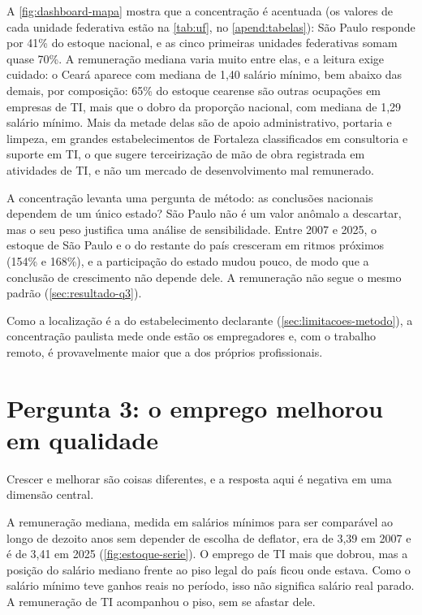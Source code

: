 A \autoref{fig:dashboard-mapa} mostra que a concentração é acentuada (os valores de cada unidade federativa estão na \autoref{tab:uf}, no \autoref{apend:tabelas}): São Paulo responde por 41\% do estoque nacional, e as cinco primeiras unidades federativas somam quase 70\%. A remuneração mediana varia muito entre elas, e a leitura exige cuidado: o Ceará aparece com mediana de 1,40 salário mínimo, bem abaixo das demais, por composição: 65\% do estoque cearense são outras ocupações em empresas de TI, mais que o dobro da proporção nacional, com mediana de 1,29 salário mínimo. Mais da metade delas são de apoio administrativo, portaria e limpeza, em grandes estabelecimentos de Fortaleza classificados em consultoria e suporte em TI, o que sugere terceirização de mão de obra registrada em atividades de TI, e não um mercado de desenvolvimento mal remunerado.

A concentração levanta uma pergunta de método: as conclusões nacionais dependem de um único estado? São Paulo não é um valor anômalo a descartar, mas o seu peso justifica uma análise de sensibilidade. Entre 2007 e 2025, o estoque de São Paulo e o do restante do país cresceram em ritmos próximos (154\% e 168\%), e a participação do estado mudou pouco, de modo que a conclusão de crescimento não depende dele. A remuneração não segue o mesmo padrão (\autoref{sec:resultado-q3}).

Como a localização é a do estabelecimento declarante (\autoref{sec:limitacoes-metodo}), a concentração paulista mede onde estão os empregadores e, com o trabalho remoto, é provavelmente maior que a dos próprios profissionais.

\section{Pergunta 3: o emprego melhorou em qualidade}
\label{sec:resultado-q3}

Crescer e melhorar são coisas diferentes, e a resposta aqui é negativa em uma dimensão central.

A remuneração mediana, medida em salários mínimos para ser comparável ao longo de dezoito anos sem depender de escolha de deflator, era de 3,39 em 2007 e é de 3,41 em 2025 (\autoref{fig:estoque-serie}). O emprego de TI mais que dobrou, mas a posição do salário mediano frente ao piso legal do país ficou onde estava. Como o salário mínimo teve ganhos reais no período, isso não significa salário real parado. A remuneração de TI acompanhou o piso, sem se afastar dele.

